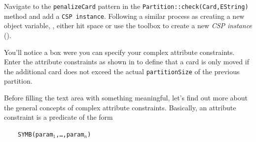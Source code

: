 \begin{stepbystep}
%
\item Navigate to the \texttt{penalizeCard} pattern in the \texttt{Partition::check(Card,EString)} method and add a \texttt{CSP instance}.
Following a similar process as creating a new object variable, \idest, either hit space or use the toolbox to create a new \emph{CSP instance} ().
%
\item You’ll notice a box were you can specify your complex attribute constraints. Enter the attribute constraints as shown in  to define that a card is only moved if the additional card does not exceed the actual \texttt{partitionSize} of the previous partition.

\end{stepbystep}

Before filling the text area with something meaningful, let's find out more about the general concepts of complex attribute constraints.
Basically, an attribute constraint is a predicate of the form

~~~~\texttt{SYMB(param$_1$,\ldots,param$_n$)}

